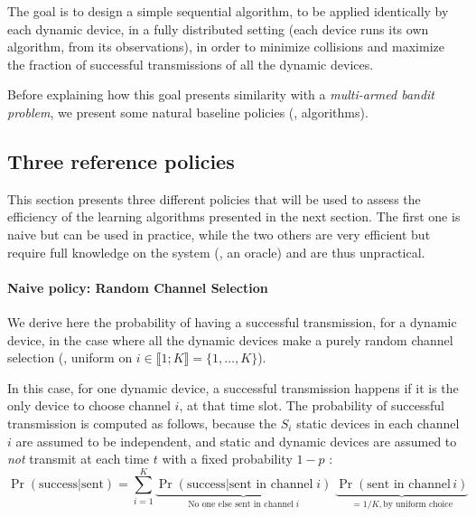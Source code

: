 The goal is to design a simple sequential algorithm, to be applied identically by each dynamic device, in a fully distributed setting (each device runs its own algorithm, from its observations), in order to minimize collisions and maximize the fraction of successful transmissions of all the dynamic devices.

Before explaining how this goal presents similarity with a \emph{multi-armed bandit problem}, we present some natural baseline policies (\ie, algorithms).


\subsection{Three reference policies}\label{sub:41:threeReferencePolicies}

This section presents three different policies that will be used to assess the efficiency of the learning algorithms presented in the next section.
The first one is naive but can be used in practice, while the two others are very efficient but require full knowledge on the system (\ie, an oracle) and are thus unpractical.


\paragraph{Naive policy: Random Channel Selection}

We derive here the probability of having a successful transmission, for a dynamic device, in the case where all the dynamic devices make a purely random channel selection (\ie, uniform on $i \in \llbracket 1; K \rrbracket = \{1, \dots, K\}$).

In this case, for one dynamic device, a successful transmission happens if it is the only device to choose channel $i$, at that time slot.
The probability of successful transmission is computed as follows, because the $S_i$ static devices in each channel $i$ are assumed to be independent, and static and dynamic devices are assumed to \emph{not} transmit at each time $t$ with a fixed probability $1-p$ :
\begin{equation}
    \Pr(\text{success}|\text{sent}) = \sum_{i=1}^{K} \underbrace{\Pr(\text{success}|\text{sent in channel}\;i)}_{\text{No one else sent in channel}\; i} \; \underbrace{\Pr(\text{sent in channel}\,i)}_{= 1/K, \text{by uniform choice}}
\end{equation}


